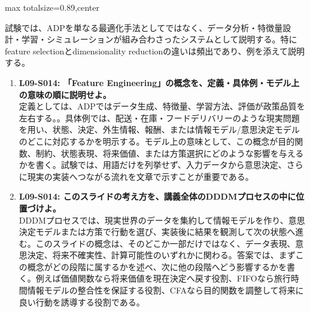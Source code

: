 \begin{minipage}[t]{0.58\textwidth}
\begin{adjustbox}{max totalsize={\textwidth}{0.89\textheight},center}
\begin{minipage}{\textwidth}
試験では、ADPを単なる最適化手法としてではなく、データ分析・特徴量設計・学習・シミュレーションが組み合わさったシステムとして説明する。特にfeature selectionとdimensionality reductionの違いは頻出であり、例を添えて説明する。\par{}\begin{enumerate}\item \textbf{L09-S014: 「Feature Engineering」の概念を、定義・具体例・モデル上の意味の順に説明せよ。}\\定義としては、ADPではデータ生成、特徴量、学習方法、評価が政策品質を左右する。。具体例では、配送・在庫・フードデリバリーのような現実問題を用い、状態、決定、外生情報、報酬、または情報モデル/意思決定モデルのどこに対応するかを明示する。モデル上の意味として、この概念が目的関数、制約、状態表現、将来価値、または方策選択にどのような影響を与えるかを書く。試験では、用語だけを列挙せず、入力データから意思決定、さらに現実の実装へつながる流れを文章で示すことが重要である。\item \textbf{L09-S014: このスライドの考え方を、講義全体のDDDMプロセスの中に位置づけよ。}\\DDDMプロセスでは、現実世界のデータを集約して情報モデルを作り、意思決定モデルまたは方策で行動を選び、実装後に結果を観測して次の状態へ進む。このスライドの概念は、そのどこか一部だけではなく、データ表現、意思決定、将来不確実性、計算可能性のいずれかに関わる。答案では、まずこの概念がどの段階に属するかを述べ、次に他の段階へどう影響するかを書く。例えば価値関数なら将来価値を現在決定へ戻す役割、FIFOなら旅行時間情報モデルの整合性を保証する役割、CFAなら目的関数を調整して将来に良い行動を誘導する役割である。\end{enumerate}
\end{minipage}
\end{adjustbox}
\end{minipage}


